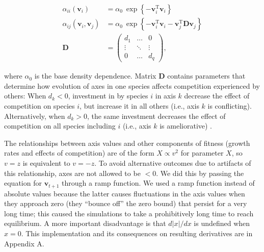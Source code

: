 \begin{equation} \label{eq:competition}
\begin{split}
    \alpha_{ii}(\mathbf{v}_i) &= \alpha_0 ~\exp \left\{
        - \mathbf{v}_i^{\textrm{T}}
        \mathbf{v}_i \right\} \\
    \alpha_{ij}(\mathbf{v}_i, \mathbf{v}_j) &= \alpha_0 ~\exp \left\{
        - \mathbf{v}_i^{\textrm{T}} \mathbf{v}_i -
        \mathbf{v}_j^{\textrm{T}} \mathbf{D} \mathbf{v}_j \right\} \\
    \mathbf{D} &= \begin{pmatrix}
        d_1     & \ldots    & 0 \\
        \vdots  & \ddots    & \vdots \\
        0       & \ldots    & d_q
        \end{pmatrix}
	\textrm{,}
\end{split}
\end{equation}



\noindent where $\alpha_0$ is the base density dependence.
Matrix $\mathbf{D}$ contains parameters that determine how evolution of axes
in one species affects competition experienced by others:
When $d_k < 0$, investment in by species $i$ in axis $k$ decrease the
effect of competition on species $i$, but increase it in all others
(i.e., axis $k$ is conflicting).
Alternatively, when $d_k > 0$, the same investment decreases the effect of
competition on all species including $i$ (i.e., axis $k$ is ameliorative)
\citep{Northfield2013a}.


The relationships between axis values and other components of fitness
(growth rates and effects of competition) are of the form
$X \propto v^2$ for parameter $X$, so $v = z$ is equivalent to $v = -z$.
To avoid alternative outcomes due to artifacts of this relationship,
axes are not allowed to be $< 0$.
We did this by passing the equation for $\mathbf{v}_{t+1}$ through a
ramp function.
We used a ramp function instead of absolute values
because the latter causes fluctuations
in the axis values when they approach zero (they ``bounce off''
the zero bound) that persist for a very long time;
this caused the simulations to take a prohibitively long time to reach
equilibrium.
A more important disadvantage is that $d \lvert x \rvert / dx$ is
undefined when $x = 0$.
This implementation and its consequences on resulting derivatives are in
Appendix A.




%


